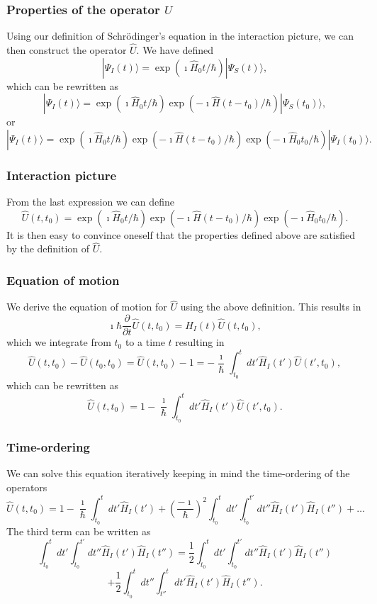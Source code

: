 \documentclass{beamer}
\begin{document}
\begin{frame}
\frametitle{Properties of the operator $U$}

Using our definition of Schrödinger's equation in the interaction picture, we can then construct the operator $\hat{U}$. We have defined
\[
|\Psi_I(t)\rangle = \exp{(\imath\hat{H}_0t/\hbar)}|\Psi_S(t)\rangle,
\]
which can be rewritten as 
\[
|\Psi_I(t)\rangle = \exp{(\imath\hat{H}_0t/\hbar)}\exp{(-\imath\hat{H}(t-t_0)/\hbar)}|\Psi_S(t_0)\rangle,
\]
or
\[
|\Psi_I(t)\rangle = \exp{(\imath\hat{H}_0t/\hbar)}\exp{(-\imath\hat{H}(t-t_0)/\hbar)}\exp{(-\imath\hat{H}_0t_0/\hbar)}|\Psi_I(t_0)\rangle.
\]
\end{frame}

\begin{frame}
\frametitle{Interaction picture}

From the last expression we can define
\[
\hat{U}(t,t_0)=\exp{(\imath\hat{H}_0t/\hbar)}\exp{(-\imath\hat{H}(t-t_0)/\hbar)}\exp{(-\imath\hat{H}_0t_0/\hbar)}.
\]
It is then easy to convince oneself that the properties defined above are satisfied by the definition of $\hat{U}$.
\end{frame}

\begin{frame}
\frametitle{Equation of motion}

We derive the equation of motion for $\hat{U}$ using the above definition.
This results in
\[
\imath \hbar\frac{\partial }{\partial t}\hat{U}(t,t_0) = \hat{H}_I(t)\hat{U}(t,t_0),
\]
which we integrate from $t_0$ to a time $t$ resulting in
\[
\hat{U}(t,t_0)-\hat{U}(t_0,t_0)=\hat{U}(t,t_0)-1=-\frac{\imath}{\hbar}\int_{t_0}^t dt' \hat{H}_I(t')\hat{U}(t',t_0),
\]
which can be rewritten as
\[
\hat{U}(t,t_0)=1-\frac{\imath}{\hbar}\int_{t_0}^t dt' \hat{H}_I(t')\hat{U}(t',t_0).
\]
\end{frame}

\begin{frame}
\frametitle{Time-ordering}

We can solve this equation iteratively keeping in mind the time-ordering of the operators
\[
\hat{U}(t,t_0)=1-\frac{\imath}{\hbar}\int_{t_0}^t dt' \hat{H}_I(t')+\left(\frac{-\imath}{\hbar}\right)^2\int_{t_0}^t dt'\int_{t_0}^{t'} dt'' \hat{H}_I(t')\hat{H}_I(t'')+\dots
\]
The third term can be written as 
\[
\int_{t_0}^t dt'\int_{t_0}^{t'} dt'' \hat{H}_I(t')\hat{H}_I(t'')=
\frac{1}{2}\int_{t_0}^t dt'\int_{t_0}^{t'} dt'' \hat{H}_I(t')\hat{H}_I(t'')
\]
\[
+\frac{1}{2}\int_{t_0}^t dt''\int_{t''}^{t} dt' \hat{H}_I(t')\hat{H}_I(t'').
\]
\end{frame}
\end{document}
